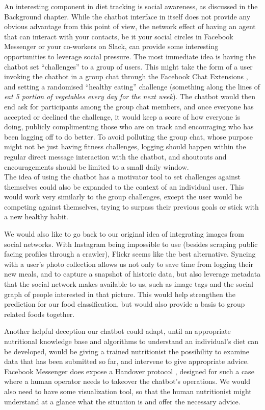 An interesting component in diet tracking is social awareness, as discussed in the Background chapter. While the chatbot interface in itself does not provide any obvious advantage from this point of view, the network effect of having an agent that can interact with your contacts, be it your social circles in Facebook Messenger or your co-workers on Slack, can provide some interesting opportunities to leverage social pressure. The most immediate idea is having the chatbot set ``challenges'' to a group of users. This might take the form of a user invoking the chatbot in a group chat through the Facebook Chat Extensions \cite{chatextensions}, and setting a randomised ``healthy eating'' challenge (something along the lines of \textit{eat 5 portion of vegetables every day for the next week}). The chatbot would then end ask for participants among the group chat members, and once everyone has accepted or declined the challenge, it would keep a score of how everyone is doing, publicly complimenting those who are on track and encouraging who has been lagging off to do better. To avoid polluting the group chat, whose purpose might not be just having fitness challenges, logging should happen within the regular direct message interaction with the chatbot, and shoutouts and encouragements should be limited to a small daily window. \\
The idea of using the chatbot has a motivator tool to set challenges against themselves could also be expanded to the context of an individual user. This would work very similarly to the group challenges, except the user would be competing against themselves, trying to surpass their previous goals or stick with a new healthy habit. 

We would also like to go back to our original idea of integrating images from social networks. With Instagram being impossible to use (besides scraping public facing profiles through a crawler), Flickr seems like the best alternative. Syncing with a user's photo collection allows us not only to save time from logging their new meals, and to capture a snapshot of historic data, but also leverage metadata that the social network makes available to us, such as image tags and the social graph of people interested in that picture. This would help strengthen the prediction for our food classification, but would also provide a basis to group related foods together. 

Another helpful deception our chatbot could adapt, until an appropriate nutritional knowledge base and algorithms to understand an individual's diet can be developed, would be giving a trained nutritionist the possibility to examine data that has been submitted so far, and intervene to give appropriate advice. Facebook Messenger does expose a Handover protocol \cite{handoverfacebook}, designed for such a case where a human operator needs to takeover the chatbot's operations. We would also need to have some visualization tool, so that the human nutritionist might understand at a glance what the situation is and offer the necessary advice.
